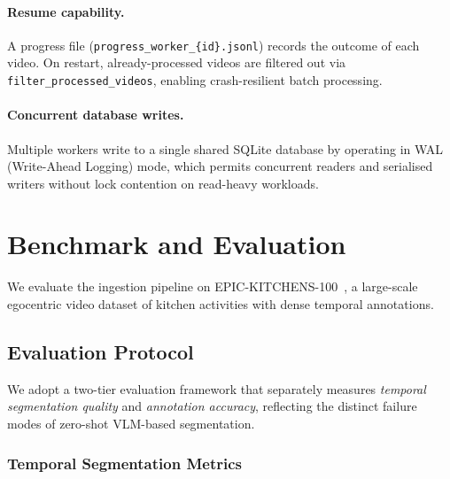 \documentclass[10pt,twocolumn]{article}
\begin{document}
\paragraph{Resume capability.}
A progress file (\texttt{progress\_worker\_\{id\}.jsonl}) records
the outcome of each video.  On restart, already-processed videos
are filtered out via \texttt{filter\_processed\_videos}, enabling
crash-resilient batch processing.

\paragraph{Concurrent database writes.}
Multiple workers write to a single shared SQLite database by
operating in WAL (Write-Ahead Logging) mode, which permits
concurrent readers and serialised writers without lock contention
on read-heavy workloads.


\section{Benchmark and Evaluation}\label{sec:eval}

We evaluate the ingestion pipeline on
EPIC-KITCHENS-100~\cite{damen2022rescaling}, a large-scale
egocentric video dataset of kitchen activities with dense temporal
annotations.

\subsection{Evaluation Protocol}

We adopt a two-tier evaluation framework that separately measures
\emph{temporal segmentation quality} and
\emph{annotation accuracy}, reflecting the distinct failure modes
of zero-shot VLM-based segmentation.

\subsubsection{Temporal Segmentation Metrics}
\end{document}
